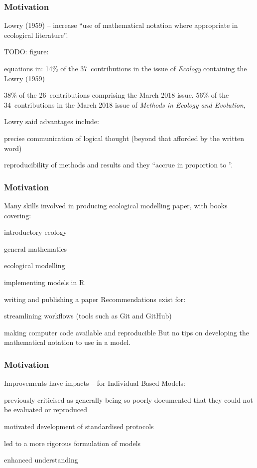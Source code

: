 
\begin{frame}
\frametitle{Motivation}
Lowry (1959) -- increase ``use of mathematical notation
where appropriate in ecological literature''.

TODO: figure:

equations in:
 14\% of the 37~contributions in the issue of \emph{Ecology} containing the
 Lowry (1959)

38\% of the 26~contributions comprising the March 2018 issue.
56\% of the 34~contributions in the March 2018 issue of \emph{Methods in Ecology and Evolution},

Lowry said advantages include:
\bi
\item precise communication of logical thought (beyond that afforded by
  the written word)
\item reproducibility of methods and results
\ei
and they ``accrue in proportion to
''.
\end{frame}


\begin{frame}
\frametitle{Motivation}
Many skills involved in producing ecological modelling paper, with books covering:
\bi
\item introductory ecology
\item general mathematics
\item ecological modelling
\item implementing models in R
\item writing and publishing a paper
\ei
  Recommendations exist for:
\bi
\item streamlining workflows (tools such as Git and GitHub)
\item making computer code available and reproducible
\ei
But no tips on developing the mathematical notation to use in a model.

\end{frame}


\begin{frame}
\frametitle{Motivation}

Improvements have impacts -- for Individual Based Models:

\bi
\item previously criticised as generally being so poorly documented
that they could not be evaluated or reproduced
\item motivated development of standardised protocols
\item led to a more rigorous formulation of models
\item enhanced understanding
\ei
\end{frame}

